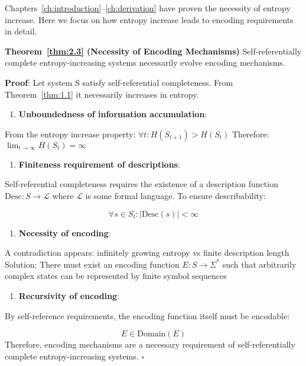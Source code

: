 Chapters~\ref{ch:introduction}--\ref{ch:derivation} have proven the necessity of entropy increase. Here we focus on how entropy increase leads to encoding requirements in detail.

\textbf{Theorem~\ref{thm:2.3} (Necessity of Encoding Mechanisms)}
\label{thm:2.3}
Self-referentially complete entropy-increasing systems necessarily evolve encoding mechanisms.

\textbf{Proof}:
Let system S satisfy self-referential completeness. From Theorem~\ref{thm:1.1} it necessarily increases in entropy.

\begin{enumerate}
\item \textbf{Unboundedness of information accumulation}:
\end{enumerate}
   From the entropy increase property: $\forall t: H(S_{t+1}) > H(S_t)$
   Therefore: $\lim_{t \to \infty} H(S_t) = \infty$
   
\begin{enumerate}
\item \textbf{Finiteness requirement of descriptions}:
\end{enumerate}
   Self-referential completeness requires the existence of a description function $\text{Desc}: S \to \mathcal{L}$
   where $\mathcal{L}$ is some formal language. To ensure describability:
   
\begin{equation}
\forall s \in S_t: |\text{Desc}(s)| < \infty
\end{equation}

\begin{enumerate}
\item \textbf{Necessity of encoding}:
\end{enumerate}
   A contradiction appears: infinitely growing entropy vs finite description length
   Solution: There must exist an encoding function $E: S \to \Sigma^*$
   such that arbitrarily complex states can be represented by finite symbol sequences
   
\begin{enumerate}
\item \textbf{Recursivity of encoding}:
\end{enumerate}
   By self-reference requirements, the encoding function itself must be encodable:
   
\begin{equation}
E \in \text{Domain}(E)
\end{equation}
Therefore, encoding mechanisms are a necessary requirement of self-referentially complete entropy-increasing systems. $\square$

